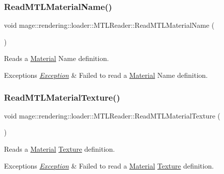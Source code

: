 \subsubsection{\texorpdfstring{Read\+M\+T\+L\+Material\+Name()}{ReadMTLMaterialName()}}
{\footnotesize\ttfamily void mage\+::rendering\+::loader\+::\+M\+T\+L\+Reader\+::\+Read\+M\+T\+L\+Material\+Name (\begin{DoxyParamCaption}{ }\end{DoxyParamCaption})\hspace{0.3cm}{\ttfamily [private]}}

Reads a \mbox{\hyperlink{classmage_1_1rendering_1_1_material}{Material}} Name definition.


\begin{DoxyExceptions}{Exceptions}
{\em \mbox{\hyperlink{classmage_1_1_exception}{Exception}}} & Failed to read a \mbox{\hyperlink{classmage_1_1rendering_1_1_material}{Material}} Name definition. \\
\hline
\end{DoxyExceptions}
\mbox{\label{classmage_1_1rendering_1_1loader_1_1_m_t_l_reader_a62b4c2d4106fb11f55af6a7de29ad37a}} 
\subsubsection{\texorpdfstring{Read\+M\+T\+L\+Material\+Texture()}{ReadMTLMaterialTexture()}}
{\footnotesize\ttfamily void mage\+::rendering\+::loader\+::\+M\+T\+L\+Reader\+::\+Read\+M\+T\+L\+Material\+Texture (\begin{DoxyParamCaption}{ }\end{DoxyParamCaption})\hspace{0.3cm}{\ttfamily [private]}}

Reads a \mbox{\hyperlink{classmage_1_1rendering_1_1_material}{Material}} \mbox{\hyperlink{classmage_1_1rendering_1_1_texture}{Texture}} definition.


\begin{DoxyExceptions}{Exceptions}
{\em \mbox{\hyperlink{classmage_1_1_exception}{Exception}}} & Failed to read a \mbox{\hyperlink{classmage_1_1rendering_1_1_material}{Material}} \mbox{\hyperlink{classmage_1_1rendering_1_1_texture}{Texture}} definition. \\
\hline
\end{DoxyExceptions}
\mbox{\label{classmage_1_1rendering_1_1loader_1_1_m_t_l_reader_a14aa8cd5655730234c460c6060552f68}} 
